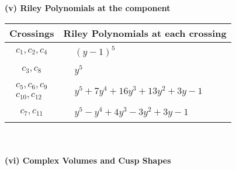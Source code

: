 \documentclass[1p]{elsarticle_modified}
\theoremstyle{definition}
\begin{document}
\newpage\renewcommand{\arraystretch}{1}
\flushleft \textbf{(v) Riley Polynomials at the component}\newline \\
\begin{tabular}{m{50pt}|m{274pt}}
Crossings & \hspace{64pt}Riley Polynomials at each crossing \\
\hline $$\begin{aligned}c_{1},c_{2},c_{4}\end{aligned}$$&$\begin{aligned}
&(y-1)^5
\end{aligned}$\\
\hline $$\begin{aligned}c_{3},c_{8}\end{aligned}$$&$\begin{aligned}
&y^5
\end{aligned}$\\
\hline $$\begin{aligned}c_{5},c_{6},c_{9}\\c_{10},c_{12}\end{aligned}$$&$\begin{aligned}
&y^5+7 y^4+16 y^3+13 y^2+3 y-1
\end{aligned}$\\
\hline $$\begin{aligned}c_{7},c_{11}\end{aligned}$$&$\begin{aligned}
&y^5- y^4+4 y^3-3 y^2+3 y-1
\end{aligned}$\\
\hline
\end{tabular}\\~\\
\newpage\flushleft \textbf{(vi) Complex Volumes and Cusp Shapes}
\end{document}
